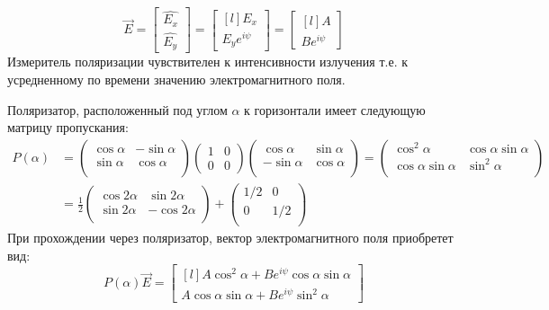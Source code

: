 \documentclass[12pt]{article}
\begin{document}
\begin{equation}
\vec{E} = \begin{bmatrix}{\hat{E_x}} \\ {\hat{E_y}} \end{bmatrix} = \begin{bmatrix*}[l]E_{x} \\ {E_y e^{i\psi}} \end{bmatrix*} = \begin{bmatrix*}[l] A \\ Be^{i\psi} \end{bmatrix*}
\tag{1}
\end{equation}
Измеритель поляризации чувствителен к интенсивности излучения т.е. к усредненному по времени значению электромагнитного поля.\par
Поляризатор, расположенный под углом $\alpha$ к горизонтали имеет следующую матрицу пропускания: 
\begin{equation}
\begin{split}
P(\alpha) &= \begin{pmatrix}\cos\alpha  &-\sin\alpha\\ \sin\alpha& \cos\alpha\\ \end{pmatrix}
 \begin{pmatrix}1&0\\0&0\end{pmatrix} \begin{pmatrix}\cos\alpha  &\sin\alpha\\ -\sin\alpha& \cos\alpha\\ \end{pmatrix}=  \begin{pmatrix}\cos^2\alpha &\cos\alpha \sin\alpha\\ \cos\alpha \sin\alpha& \sin^2\alpha\\ \end{pmatrix} \\ &= \frac{1}{2} \begin{pmatrix}\cos 2\alpha &\sin 2\alpha\\\sin 2\alpha& -\cos 2\alpha\\ \end{pmatrix} +\begin{pmatrix}1/2 & 0\\ 0& 1/2\\\end{pmatrix}
\end{split}
\end{equation}
При прохождении через поляризатор, вектор электромагнитного поля приобретет вид:
\begin{equation}
P(\alpha)\vec{E} =  \begin{bmatrix*}[l] A \cos^2 \alpha + Be^{i\psi} \cos\alpha \sin \alpha \\A \cos\alpha \sin \alpha + Be^{i\psi} \sin^2 \alpha  \end{bmatrix*}
	\tag{1}
	\end{equation}
\end{document}
